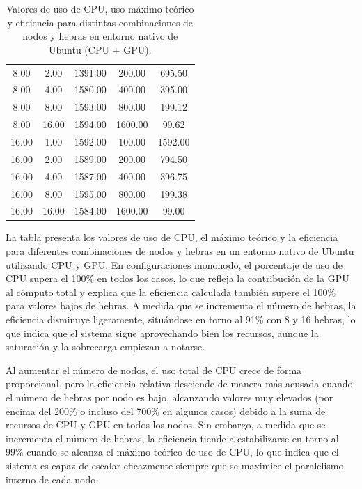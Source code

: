 \begin{table}[ht]
\begin{tabular}{|c|c|c|c|c|}
        8.00           & 2.00            & 1391.00           & 200.00            & 695.50              \\
        8.00           & 4.00            & 1580.00           & 400.00            & 395.00              \\
        8.00           & 8.00            & 1593.00           & 800.00            & 199.12              \\
        8.00           & 16.00           & 1594.00           & 1600.00           & 99.62               \\
        16.00          & 1.00            & 1592.00           & 100.00            & 1592.00             \\
        16.00          & 2.00            & 1589.00           & 200.00            & 794.50              \\
        16.00          & 4.00            & 1587.00           & 400.00            & 396.75              \\
        16.00          & 8.00            & 1595.00           & 800.00            & 199.38              \\
        16.00          & 16.00           & 1584.00           & 1600.00           & 99.00               \\
        \hline
    \end{tabular}
    \caption{Valores de uso de CPU, uso máximo teórico y eficiencia para distintas combinaciones de nodos y hebras en entorno nativo de Ubuntu (CPU + GPU).}
    \label{tab:thread_sweep_ubuntu_gpu_native_cpu}
\end{table}

La tabla presenta los valores de uso de CPU, el máximo teórico y la eficiencia para diferentes combinaciones de nodos y hebras en un entorno nativo de Ubuntu utilizando CPU y GPU. En configuraciones mononodo, el porcentaje de uso de CPU supera el 100\% en todos los casos, lo que refleja la contribución de la GPU al cómputo total y explica que la eficiencia calculada también supere el 100\% para valores bajos de hebras. A medida que se incrementa el número de hebras, la eficiencia disminuye ligeramente, situándose en torno al 91\% con 8 y 16 hebras, lo que indica que el sistema sigue aprovechando bien los recursos, aunque la saturación y la sobrecarga empiezan a notarse.

Al aumentar el número de nodos, el uso total de CPU crece de forma proporcional, pero la eficiencia relativa desciende de manera más acusada cuando el número de hebras por nodo es bajo, alcanzando valores muy elevados (por encima del 200\% o incluso del 700\% en algunos casos) debido a la suma de recursos de CPU y GPU en todos los nodos. Sin embargo, a medida que se incrementa el número de hebras, la eficiencia tiende a estabilizarse en torno al 99\% cuando se alcanza el máximo teórico de uso de CPU, lo que indica que el sistema es capaz de escalar eficazmente siempre que se maximice el paralelismo interno de cada nodo.


